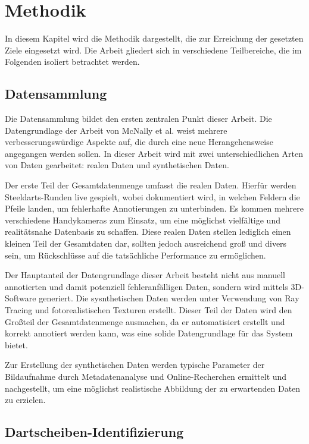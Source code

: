 \section{Methodik}
\label{sec:methodik}

In diesem Kapitel wird die Methodik dargestellt, die zur Erreichung der gesetzten Ziele eingesetzt wird. Die Arbeit gliedert sich in verschiedene Teilbereiche, die im Folgenden isoliert betrachtet werden.

\subsection{Datensammlung}
\label{sec:methodik:datensammlung}

Die Datensammlung bildet den ersten zentralen Punkt dieser Arbeit. Die Datengrundlage der Arbeit von McNally et al. weist mehrere verbesserungswürdige Aspekte auf, die durch eine neue Herangehensweise angegangen werden sollen. In dieser Arbeit wird mit zwei unterschiedlichen Arten von Daten gearbeitet: realen Daten und synthetischen Daten.

Der erste Teil der Gesamtdatenmenge umfasst die realen Daten. Hierfür werden Steeldarts-Runden live gespielt, wobei dokumentiert wird, in welchen Feldern die Pfeile landen, um fehlerhafte Annotierungen zu unterbinden. Es kommen mehrere verschiedene Handykameras zum Einsatz, um eine möglichst vielfältige und realitätsnahe Datenbasis zu schaffen. Diese realen Daten stellen lediglich einen kleinen Teil der Gesamtdaten dar, sollten jedoch ausreichend groß und divers sein, um Rückschlüsse auf die tatsächliche Performance zu ermöglichen.

Der Hauptanteil der Datengrundlage dieser Arbeit besteht nicht aus manuell annotierten und damit potenziell fehleranfälligen Daten, sondern wird mittels 3D-Software generiert. Die sysnthetischen Daten werden unter Verwendung von Ray Tracing und fotorealistischen Texturen erstellt. Dieser Teil der Daten wird den Großteil der Gesamtdatenmenge ausmachen, da er automatisiert erstellt und korrekt annotiert werden kann, was eine solide Datengrundlage für das System bietet.

Zur Erstellung der synthetischen Daten werden typische Parameter der Bildaufnahme durch Metadatenanalyse und Online-Recherchen ermittelt und nachgestellt, um eine möglichst realistische Abbildung der zu erwartenden Daten zu erzielen.

\subsection{Dartscheiben-Identifizierung}
\label{sec:methodik:dartscheibe}

